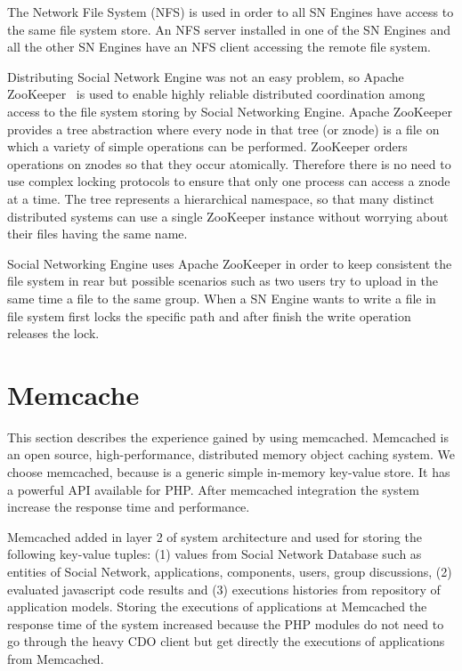The Network File System (NFS) is used in order to all SN Engines have access to the same file system store. An NFS server installed in one of the SN Engines and all the other SN Engines have an NFS client accessing the remote file system.   

Distributing Social Network Engine was not an easy problem, so Apache ZooKeeper~\cite{zookeeper_url} is used to enable highly reliable distributed coordination among access to the file system storing by Social Networking Engine. 
Apache ZooKeeper provides a tree abstraction where every node in that tree (or znode) is a file on which a variety of simple operations can be performed. ZooKeeper orders operations on znodes so that they occur atomically. Therefore there is no need to use complex locking protocols to ensure that only one process can access a znode at a time. The tree represents a hierarchical namespace, so that many distinct distributed systems can use a single ZooKeeper instance without worrying about their files having the same name.

Social Networking Engine uses Apache ZooKeeper in order to keep consistent the file system in rear but possible scenarios such as two users try to upload in the same time a file to the same group. When a SN Engine wants to write a file in file system first locks the specific path and after finish the write operation releases the lock.

\section{Memcache}
\label{sec:memcache_implementation}
This section describes the experience gained by using memcached\cite{memcache_url}. Memcached is an open source, high-performance, distributed memory object caching system. We choose memcached, because is a generic simple in-memory key-value store. It has a powerful API available for PHP. After memcached integration the system increase the response time and performance.

Memcached added in layer 2 of system architecture and used for storing the following key-value tuples: (1) values from Social Network Database such as entities of Social Network, applications, components, users, group discussions, (2) evaluated javascript code results and (3) executions histories from repository of application models. Storing the executions of applications at Memcached the response time of the system increased because the PHP modules do not need to go through the heavy CDO client but get directly the executions of applications from Memcached.

